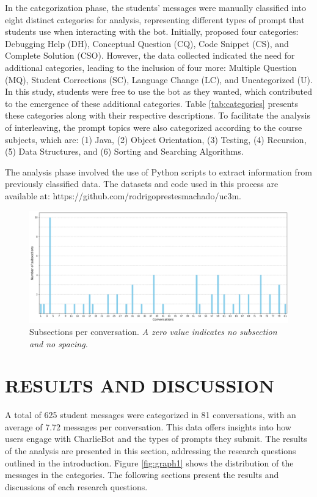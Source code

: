 \documentclass[a4paper,twoside]{article}
\begin{document}
In the categorization phase, the students' messages were manually classified
into eight distinct categories for analysis, representing different types of
prompt that students use when interacting with the bot. Initially,
\cite{Ghimire24} proposed four categories: Debugging Help (DH), Conceptual
Question (CQ), Code Snippet (CS), and Complete Solution (CSO). However, the data
collected indicated the need for additional categories, leading to the inclusion
of four more: Multiple Question (MQ), Student Corrections (SC), Language Change
(LC), and Uncategorized (U). In this study, students were free to use the bot as
they wanted, which contributed to the emergence of these additional categories.
Table \ref{tab:categories} presents these categories along with their respective
descriptions. To facilitate the analysis of interleaving, the prompt topics were
also categorized according to the course subjects, which are: (1) Java, (2)
Object Orientation, (3) Testing, (4) Recursion, (5) Data Structures, and (6)
Sorting and Searching Algorithms.

The analysis phase involved the use of Python scripts to extract information
from previously classified data. The datasets and code used in this process are
available at: https://github.com/rodrigoprestesmachado/uc3m.

\begin{figure}[htbp]
  \centering
  \includegraphics[scale=0.39]{img/figure3.png}
  \caption{Subsections per conversation. \textit{A zero value indicates
  no subsection and no spacing.}}
  \label{fig:graph3}
\end{figure}

\section{\uppercase{Results and Discussion}}

A total of 625 student messages were categorized in 81 conversations, with
an average of 7.72 messages per conversation. This data offers insights into how
users engage with CharlieBot and the types of prompts they submit. The results
of the analysis are presented in this section, addressing the research questions
outlined in the introduction. Figure \ref{fig:graph1} shows the distribution of
the messages in the categories. The following sections present the results and
discussions of each research questions.
\end{document}
